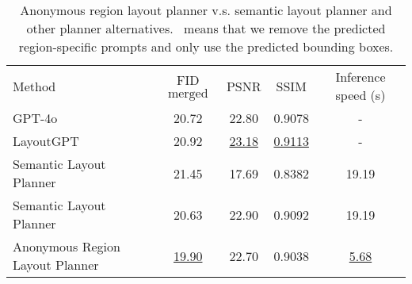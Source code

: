 \begin{table}[t]
	\begin{minipage}[t]{1\linewidth}  
		\centering 
		\resizebox{0.99\linewidth}{!}
		{
			\begin{tabular}{l|c|cc|c}  
				Method  &  FID$\scriptstyle \text{merged}$ & PSNR & SSIM & Inference speed (s) \\
				\shline
				GPT-4o & 20.72 & 22.80 & 0.9078 & - \\
				LayoutGPT~\cite{feng2024layoutgpt} & 20.92 & \underline{23.18} & \underline{0.9113} & -  \\ \hline
				Semantic Layout Planner & 21.45 & 17.69 & 0.8382 & 19.19 \\
				Semantic Layout Planner\dag & 20.63 & 22.90 & 0.9092 & 19.19 \\
				Anonymous Region Layout Planner & \underline{19.90} & 22.70 & 0.9038 & \underline{5.68} \\
			\end{tabular}
		}
		\vspace{-2mm}
		\caption{
			\footnotesize{Anonymous region layout planner v.s. semantic layout planner and other planner alternatives. \dag\, means that we remove the predicted region-specific prompts and only use the predicted bounding boxes.}}
		\label{tab:ablation:layout_compare}
	\end{minipage}
	\vspace{-2mm}
\end{table}

